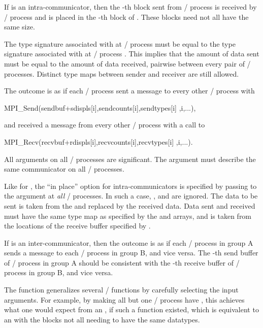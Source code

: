 If  is an intra-communicator, then
the -th block sent from \MPI/ process  is received by \MPI/ process
 and is placed in the -th block of .
These blocks need not all have the same size.

The type signature associated with
 at \MPI/ process  must be equal
to the type signature
associated with  at \MPI/ process .
This implies that the amount of data sent must be equal to the
amount of data received, pairwise between every pair of \MPI/ processes.
Distinct type maps between sender and receiver are still allowed.

The outcome is as if each \MPI/ process sent a message to every other \MPI/ process with
\begin{mpicodeblock}
MPI\_Send(sendbuf+sdispls[i],sendcounts[i],sendtypes[i] ,i,...),
\end{mpicodeblock}
\noindent and received a message from every other \MPI/ process with a call to
\begin{mpicodeblock}
MPI\_Recv(recvbuf+rdispls[i],recvcounts[i],recvtypes[i] ,i,...).
\end{mpicodeblock}

All arguments on all \MPI/ processes are significant.  The argument
 must describe the same communicator on all \MPI/ processes.

Like for , the ``in place'' option for intra-communicators
is specified by passing  to the argument 
at \emph{all} \MPI/ processes.
In such a case, ,  and  are ignored.
The data to be sent is taken from the  and replaced by the received data.
Data sent and received must have the same type map as specified by the 
and  arrays, and is taken from the locations of the receive buffer
specified by .

If  is an inter-communicator, then the outcome is as if
each \MPI/ process in group A sends a message to each \MPI/ process in group B,
and vice versa.  The -th send buffer of \MPI/ process  in group A should
be consistent with the -th receive buffer of \MPI/ process  in group B,
and vice versa.


\begin{rationale}
The  function generalizes several \MPI/ functions by
carefully selecting the input arguments.  For example, by making all but one
\MPI/ process have , 
this achieves what one would expect from an , if such a function existed, which is equivalent to an  with the blocks not all needing to have the same datatypes. 
\end{rationale}

